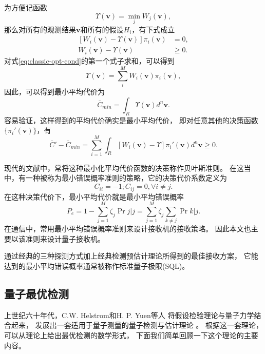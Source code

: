 为方便记函数
\begin{equation}
\Upsilon(\bm{v}) = \min_j W_j(\bm{v}), 
\end{equation}
那么对所有的观测结果$\bm{v}$和所有的假设$H_i$，有下式成立
\begin{equation}
\begin{split}
[W_i(\bm{v}) - \Upsilon(\bm{v})] \pi_i(\bm{v}) &= 0,  \\
W_i(\bm{v}) - \Upsilon(\bm{v}) &\ge 0.
\label{eq:classic-opt-cond}
\end{split}
\end{equation}
对式\ref{eq:classic-opt-cond}的第一个式子求和，可以得到
\begin{equation}
\Upsilon(\bm{v}) = \sum_i^M W_i(\bm{v})\pi_i(\bm{v}), 
\end{equation}
因此，可以得到最小平均代价为
\begin{equation}
\bar{C}_{min} = \int_R \Upsilon(\bm{v}) d^n \bm{v}. 
\end{equation}
容易验证，这样得到的平均代价确实是最小平均代价，
即对任意其他的决策函数$\{\pi_i'(\bm{v})\}$，有
\begin{equation}
\bar{C}' - \bar{C}_{min} = \sum_{i=1}^M \int_R [W_i(\bm{v}) - \Upsilon] \pi_i'(\bm{v}) d^n \bm{v} \ge 0. 
\end{equation}


现代的文献中，常将这种最小化平均代价函数的决策称作贝叶斯准则。
在这当中，有一种被称为最小错误概率准则的策略，它的决策代价系数定义为
\begin{equation}
C_{ii} = -1; C_{ij}=0, \forall i\neq j. 
\label{eq:min-err-cond}
\end{equation}
在这种决策代价下，最小平均代价就是最小平均错误概率
\begin{equation}
P_e = 1 - \sum_{j=1}^M \zeta_j \Pr{j|j} = \sum_{j=1}^M \zeta_j \sum_{k\neq j}\Pr{k|j}.
\end{equation}
在通信中，常用最小平均错误概率准则来设计接收机的接收策略。
因此本文也主要以该准则来设计量子接收机。

通过经典的三种探测方式加上经典检测预估计理论所得到的最佳接收方案，
它能达到的最小平均错误概率通常被称作标准量子极限(SQL)。




\subsection{量子最优检测}
上世纪六十年代，C.W. Helstrom和H. P. Yuen等人
将假设检验理论与量子力学结合起来，
发展出一套适用于量子测量的量子检测与估计理论
\cite{helstrom1976quantum,helstrom1967detection,yuen1975optimum}。
根据这一套理论，可以从理论上给出最优检测的数学形式，
下面我们简单回顾一下这个理论的主要内容。

